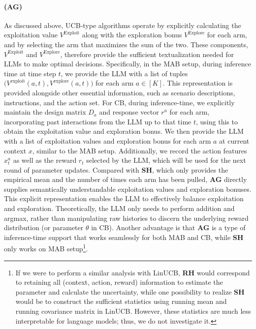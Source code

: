\paragraph{\ag (AG)} As discussed above, UCB-type algorithms operate by explicitly calculating the exploitation value $V^\text{Exploit}$ along with the exploration bonus $V^\text{Explore}$ for each arm, and by selecting the arm that maximizes the sum of the two. These components, $V^\text{Exploit}$ and $V^\text{Explore}$, therefore provide the sufficient textualization needed for LLMs to make optimal decisions.
Specifically, in the MAB setup, during inference time at time step $t$, we provide the LLM with a list of tuples $\big(V^{\text{exploit}}(a,t), V^{\text{explore}}(a,t)\big)$ for each arm $a\in[K]$. This representation is provided alongside  other essential information, such as scenario descriptions, instructions, and the action set. 
For CB, during inference-time, we explicitly maintain the design matrix $D_a$ and response vector $r^a$ for each arm, incorporating past interactions from the LLM up to that time $t$, using this to obtain the exploitation value and exploration bonus. We then provide the LLM with a list of exploitation values and exploration bonus for each arm $a$ at current context $x$, similar to the MAB setup. Additionally, we record the action features $x^a_t$ as well as the reward $r_t$ selected by the LLM, which will be used for the next round of parameter updates. 
Compared with \textbf{SH}, which only provides the empirical mean and the number of times each arm has been pulled, \textbf{AG} directly supplies semantically understandable exploitation values and exploration bonuses. This explicit representation enables the LLM to effectively balance exploitation and exploration.  Theoretically, the LLM only needs to perform addition and argmax, rather than manipulating raw histories to discern the underlying reward distribution (or parameter $\theta$ in CB). Another advantage is that \textbf{AG} is a type of inference-time support that works seamlessly for both MAB and CB, while \textbf{SH} only works on MAB setup\footnote{If we were to perform a similar analysis with LinUCB, \textbf{RH} would correspond to retaining all (context, action, reward) information to estimate the parameter and calculate the uncertainty, while one possibility to realize \textbf{SH} would be to construct the sufficient statistics using running mean and running covariance matrix in LinUCB. However, these statistics are much less interpretable for language models; thus, we do not investigate it.}. 

